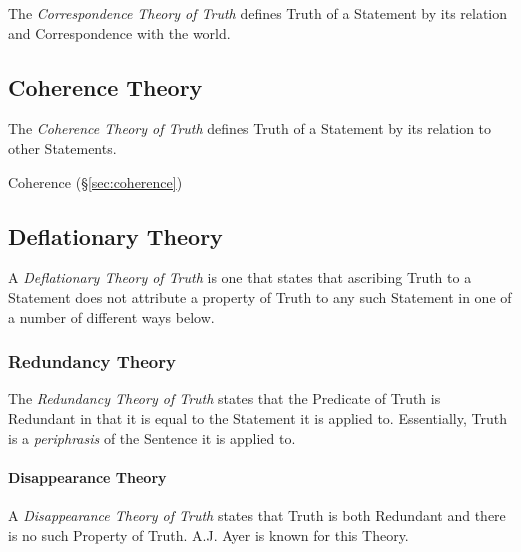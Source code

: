 The \emph{Correspondence Theory of Truth} defines Truth of a Statement
by its relation and Correspondence with the world.



\subsection{Coherence Theory}\label{sec:coherence_theory}

The \emph{Coherence Theory of Truth} defines Truth of a Statement by its
relation to other Statements.

\fist Coherence (\S\ref{sec:coherence})



\subsection{Deflationary Theory}\label{sec:deflationary_truth}

A \emph{Deflationary Theory of Truth} is one that states that
ascribing Truth to a Statement does not attribute a property of Truth
to any such Statement in one of a number of different ways below.



\subsubsection{Redundancy Theory}\label{sec:redundancy_theory}

The \emph{Redundancy Theory of Truth} states that the Predicate of
Truth is Redundant in that it is equal to the Statement it is applied
to.\cite{ramsey27} Essentially, Truth is a \emph{periphrasis} of the
Sentence it is applied to.



\paragraph{Disappearance Theory}\label{sec:disappearance_theory}\hfill

A \emph{Disappearance Theory of Truth} states that Truth is both
Redundant and there is no such Property of Truth. A.J. Ayer is known
for this Theory.



